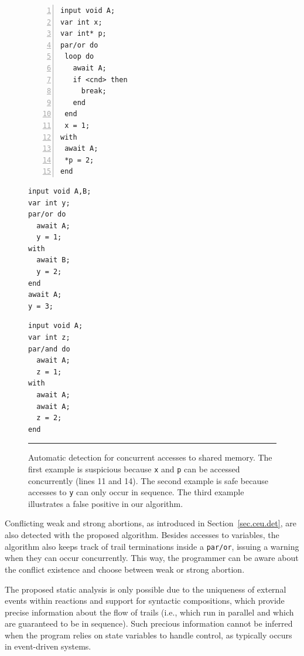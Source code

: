 \documentclass[letterpaper]{sig-alternate}
\newcommand{\code}[1] {{\small{\texttt{#1}}}}
\begin{document}
\begin{figure}[t]
\begin{minipage}[t]{0.40\linewidth}
\begin{lstlisting}[numbers=left,xleftmargin=2.5em]
input void A;
var int x;
var int* p;
par/or do
 loop do
   await A;
   if <cnd> then
     break;
   end
 end
 x = 1;
with
 await A;
 *p = 2;
end

\end{lstlisting}
\end{minipage}
%
%
\begin{minipage}[t]{0.31\linewidth}
\begin{lstlisting}
input void A,B;
var int y;
par/or do
  await A;
  y = 1;
with
  await B;
  y = 2;
end
await A;
y = 3;

\end{lstlisting}
\end{minipage}
%
%
\begin{minipage}[t]{0.27\linewidth}
\begin{lstlisting}
input void A;
var int z;
par/and do
  await A;
  z = 1;
with
  await A;
  await A;
  z = 2;
end
\end{lstlisting}
\end{minipage}
%
\rule{8.5cm}{0.37pt}
\caption{ Automatic detection for concurrent accesses to shared memory. \newline
{\small %
The first example is suspicious because \code{x} and \code{p} can be accessed 
concurrently (lines 11 and 14).
The second example is safe because accesses to \code{y} can only occur in 
sequence.
The third example illustrates a false positive in our algorithm.
}%
\label{lst.det}
}
\end{figure}

Conflicting weak and strong abortions, as introduced in 
Section~\ref{sec.ceu.det}, are also detected with the proposed algorithm.
Besides accesses to variables, the algorithm also keeps track of trail 
terminations inside a \code{par/or}, issuing a warning when they can occur 
concurrently.
This way, the programmer can be aware about the conflict existence and choose
between weak or strong abortion.

The proposed static analysis is only possible due to the uniqueness of external 
events within reactions and support for syntactic compositions, which provide 
precise information about the flow of trails (i.e., which run in parallel and 
which are guaranteed to be in sequence).
Such precious information cannot be inferred when the program relies on state 
variables to handle control, as typically occurs in event-driven systems.
\end{document}
